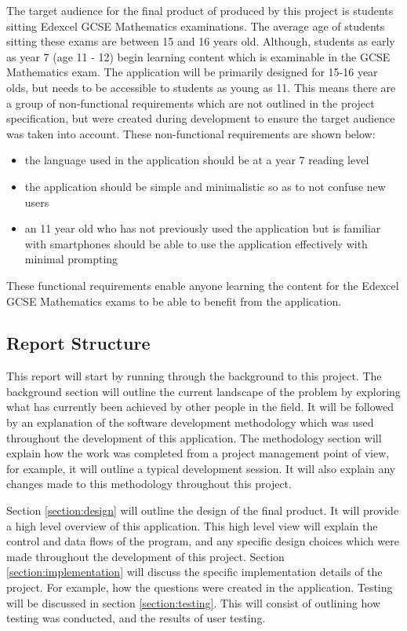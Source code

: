 \documentclass{article}
\begin{document}
The target audience for the final product of produced by this project is students sitting Edexcel GCSE Mathematics examinations. The average age of students sitting these exams are between 15 and 16 years old. Although, students as early as year 7 (age 11 - 12) begin learning content which is examinable in the GCSE Mathematics exam. The application will be primarily designed for 15-16 year olds, but needs to be accessible to students as young as 11. This means there are a group of non-functional requirements which are not outlined in the project specification, but were created during development to ensure the target audience was taken into account. These non-functional requirements are shown below:

\begin{itemize}
	\item the language used in the application should be at a year 7 reading level
	\item the application should be simple and minimalistic so as to not confuse new users
	\item an 11 year old who has not previously used the application but is familiar with smartphones should be able to use the application effectively with minimal prompting
\end{itemize}

These functional requirements enable anyone learning the content for the Edexcel GCSE Mathematics exams to be able to benefit from the application.

\subsection{Report Structure}

This report will start by running through the background to this project. The background section will outline the current landscape of the problem by exploring what has currently been achieved by other people in the field. It will be followed by an explanation of the software development methodology which was used throughout the development of this application. The methodology section will explain how the work was completed from a project management point of view, for example, it will outline a typical development session. It will also explain any changes made to this methodology throughout this project. \par

Section \ref{section:design} will outline the design of the final product. It will provide a high level overview of this application. This high level view will explain the control and data flows of the program, and any specific design choices which were made throughout the development of this project. Section \ref{section:implementation} will discuss the specific implementation details of the project. For example, how the questions were created in the application. Testing will be discussed in section \ref{section:testing}. This will consist of outlining how testing was conducted, and the results of user testing. \par
\end{document}
